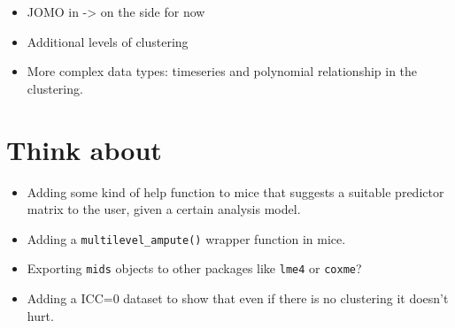 \documentclass[
]{jss}
\begin{document}
\begin{itemize}
\item
  JOMO in  -\textgreater{} on the side for now
\item
  Additional levels of clustering
\item
  More complex data types: timeseries and polynomial relationship in the
  clustering.
\end{itemize}

\hypertarget{think-about}{%
\section{Think about}\label{think-about}}

\begin{itemize}
\item
  Adding some kind of help function to mice that suggests a suitable
  predictor matrix to the user, given a certain analysis model.
\item
  Adding a \texttt{multilevel\_ampute()} wrapper function in mice.
\item
  Exporting \texttt{mids} objects to other packages like \texttt{lme4}
  or \texttt{coxme}?
\item
  Adding a ICC=0 dataset to show that even if there is no clustering it
  doesn't hurt.
\end{itemize}

\renewcommand\refname{References}

\end{document}
